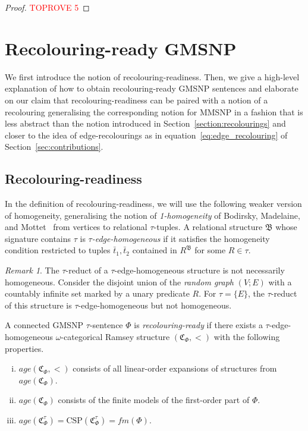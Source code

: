 \documentclass[oneside,reqno,12pt]{amsart}
\theoremstyle{plain}
\theoremstyle{remark}
\newtheorem{remark}[thm]{Remark}
\newcommand{\struct}[1]{\mathfrak{#1}}
\newcommand{\CSP}{\ensuremath{\mathrm{CSP}}\xspace}
\newcommand{\age}{\ensuremath{\mathit{age}}\xspace}
\newcommand{\fm}{\ensuremath{\mathit{fm}}\xspace}
\begin{document}
{\begin{proof}\textcolor{red}{TOPROVE 5}\end{proof}

 
\section{Recolouring-ready GMSNP} \label{section:recolouring_ready}
We first introduce the notion of recolouring-readiness.   
Then, we give a high-level explanation of how to obtain recolouring-ready GMSNP sentences and elaborate on our claim that recolouring-readiness can be paired with a notion of a recolouring generalising the corresponding notion for MMSNP in a fashion that is less abstract than the notion introduced in Section~\ref{section:recolourings} and   closer to the idea of edge-recolourings as in equation~\eqref{eq:edge_recolouring} of Section~\ref{sec:contributions}.



\subsection{Recolouring-readiness} 
In the definition of recolouring-readiness, we will use the following weaker version of homogeneity, generalising the notion of \emph{1-homogeneity} of Bodirsky, Madelaine, and Mottet~\cite{bodirsky2018_article} from vertices to relational $\tau$-tuples. 
A relational structure $\struct{B}$ whose signature contains $\tau$ is \emph{$\tau$-edge-homogeneous} 
if it satisfies the homogeneity condition restricted to tuples $\bar{t}_1,\bar{t}_2$ contained in  $R^{\struct{B}}$ for some $R\in \tau$. 
\begin{remark} 
The $\tau$-reduct of a $\tau$-edge-homogeneous structure is not necessarily homogeneous.
Consider the disjoint union of the \emph{random graph} $(V;E)$ with a countably infinite set marked by a unary predicate $R$. For $\tau=\{E\}$, the $\tau$-reduct of this structure is $\tau$-edge-homogeneous but not homogeneous.
\end{remark} 
 A connected GMSNP $\tau$-sentence $\Phi$ is \emph{recolouring-ready} if there exists a $\tau$-edge-homogeneous $\omega$-categorical Ramsey structure $(\struct{C}_{\Phi},<)$  with the following properties. 
\begin{enumerate}[i.]
\item \label{item:1} $\age(\struct{C}_{\Phi},<)$ consists of all linear-order expansions of structures from $\age(\struct{C}_{\Phi})$. 
    \item \label{item:2} $\age(\struct{C}_{\Phi})$ consists of the finite models of  the first-order part of $\Phi$. 
    \item \label{item:3}  $\age(\struct{C}_{\Phi}^{\tau})=\CSP(\struct{C}_{\Phi}^{\tau})=\fm(\Phi)$.  
\end{enumerate} 
 
}
\end{document}
